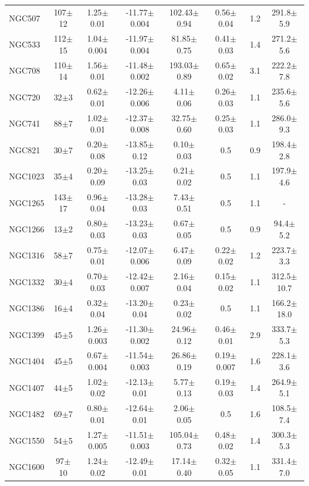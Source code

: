 \documentclass[iop]{emulateapj}
\begin{document}
\begin{table}
\begin{tabular}{lccccccc}
NGC507  & 107$\pm$12 & 1.25$\pm$0.01 & -11.77$\pm$0.004 & 102.43$\pm$0.94 & 0.56$\pm$0.04 & 1.2  & 291.8$\pm$5.9\\
NGC533  & 112$\pm$15 & 1.04$\pm$0.004 & -11.97$\pm$0.004 & 81.85$\pm$0.75 & 0.41$\pm$0.03 & 1.4  & 271.2$\pm$5.6\\
NGC708  & 110$\pm$14 & 1.56$\pm$0.01 & -11.48$\pm$0.002 & 193.03$\pm$0.89 & 0.65$\pm$0.02 & 3.1  & 222.2$\pm$7.8\\
NGC720  & 32$\pm$3 & 0.62$\pm$0.01 & -12.26$\pm$0.006 & 4.11$\pm$0.06 & 0.26$\pm$0.03 & 1.1  & 235.6$\pm$5.6\\
NGC741  & 88$\pm$7 & 1.02$\pm$0.01 & -12.37$\pm$0.008 & 32.75$\pm$0.60 & 0.25$\pm$0.03 & 1.1  & 286.0$\pm$9.3\\
NGC821  & 30$\pm$7 & 0.20$\pm$0.08 & -13.85$\pm$0.12 & 0.10$\pm$0.03 & 0.5 & 0.9  & 198.4$\pm$2.8\\
NGC1023 & 35$\pm$4 & 0.20$\pm$0.09 & -13.25$\pm$0.03 & 0.21$\pm$0.02 & 0.5 & 1.1  & 197.9$\pm$4.6 \\
NGC1265 & 143$\pm$17 & 0.96$\pm$0.04 & -13.28$\pm$0.03  & 7.43$\pm$0.51  & 0.5 & 1.1  & - \\
NGC1266 & 13$\pm$2  & 0.80$\pm$0.03 & -13.23$\pm$0.03 & 0.67$\pm$0.05 & 0.5 & 0.9  & 94.4$\pm$5.2\\
NGC1316 & 58$\pm$7 & 0.75$\pm$0.01 & -12.07$\pm$0.006  & 6.47$\pm$0.09  & 0.22$\pm$0.02 & 1.2  & 223.7$\pm$3.3\\
NGC1332 & 30$\pm$4 & 0.70$\pm$0.03 & -12.42$\pm$0.007  & 2.16$\pm$0.04  & 0.15$\pm$0.02 & 1.1  & 312.5$\pm$10.7\\
NGC1386 & 16$\pm$4 & 0.32$\pm$0.04 & -13.20$\pm$0.04 & 0.23$\pm$0.02  & 0.5 & 1.1  & 166.2$\pm$18.0\\
NGC1399 & 45$\pm$5 & 1.26$\pm$0.003 & -11.30$\pm$0.002  & 24.96$\pm$0.12  & 0.46$\pm$0.01 & 2.9  & 333.7$\pm$5.3 \\
NGC1404 & 45$\pm$5 & 0.67$\pm$0.004 & -11.54$\pm$0.003 & 26.86$\pm$0.19  & 0.19$\pm$0.007 & 1.6  & 228.1$\pm$3.6\\
NGC1407 & 44$\pm$5 & 1.02$\pm$0.02 & -12.13$\pm$0.01 & 5.77$\pm$0.13 & 0.19$\pm$0.03 & 1.4  & 264.9$\pm$5.1\\
NGC1482 & 69$\pm$7 & 0.80$\pm$0.01 & -12.64$\pm$0.01  & 2.06$\pm$0.05  & 0.5 & 1.6  & 108.5$\pm$7.4 \\
NGC1550 & 54$\pm$5 & 1.27$\pm$0.005 & -11.51$\pm$0.003 & 105.04$\pm$0.73 & 0.48$\pm$0.02 & 1.4  & 300.3$\pm$5.3\\
NGC1600 & 97$\pm$10 & 1.24$\pm$0.02 & -12.49$\pm$0.01 & 17.14$\pm$0.40  & 0.32$\pm$0.05 & 1.1  & 331.4$\pm$7.0\\ 

\end{tabular}
\end{table}
\end{document}
